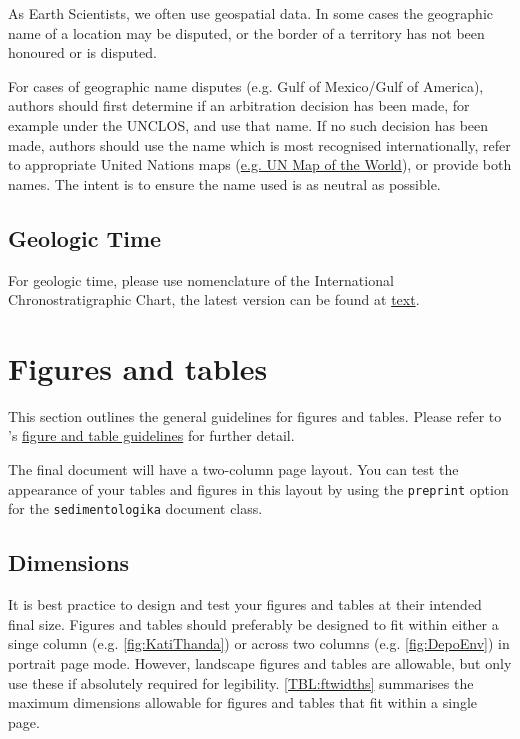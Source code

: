 \documentclass[submission, anonymous]{sedimentologika}
\begin{document}
As Earth Scientists, we often use geospatial data.
In some cases the geographic name of a location may be disputed, or the border of a territory has not been honoured or is disputed.

For cases of geographic name disputes (e.g. Gulf of Mexico/Gulf of America), authors should first determine if an arbitration decision has been made, for example under the UNCLOS, and use that name.
If no such decision has been made, authors should use the name which is most recognised internationally, refer to appropriate United Nations maps (\href{https://www.un.org/geospatial/content/map-world-1}{e.g. UN Map of the World}), or provide both names.
The intent is to ensure the name used is as neutral as possible.

\subsection{Geologic Time}

For geologic time, please use nomenclature of the International Chronostratigraphic Chart, the latest version can be found at \href{https://stratigraphy.org/chart/}{text}.

\section{Figures and tables}

This section outlines the general guidelines for figures and tables.
Please refer to \Sedimentologika's \href{https://sedimentologika.org/figures-tables-guidelines}{figure and table guidelines} for further detail.

The final document will have a two-column page layout.
You can test the appearance of your tables and figures in this layout by using the \texttt{preprint} option for the \texttt{sedimentologika} document class.

\subsection{Dimensions}

It is best practice to design and test your figures and tables at their intended final size.
Figures and tables should preferably be designed to fit within either a singe column (e.g. \autoref{fig:KatiThanda}) or across two columns (e.g. \autoref{fig:DepoEnv}) in portrait page mode.
However, landscape figures and tables are allowable, but only use these if absolutely required for legibility.
\autoref{TBL:ftwidths} summarises the maximum dimensions allowable for figures and tables that fit within a single page.
\end{document}

